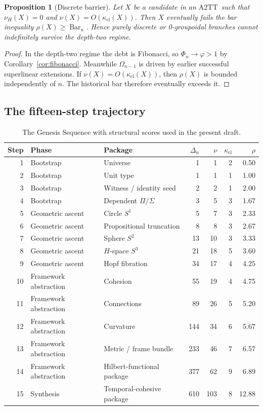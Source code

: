 \documentclass{lmcs}
\theoremstyle{plain}
\newtheorem{prop}[thm]{Proposition}
\theoremstyle{definition}
\theoremstyle{remark}
\newcommand{\ATwo}{\ensuremath{\mathrm{A2TT}}}
\newcommand{\SelBar}{\ensuremath{\operatorname{Bar}}}
\begin{document}
\begin{prop}[Discrete barrier]
\label{prop:discrete}
Let $X$ be a candidate in an \ATwo\ such that $\nu_H(X)=0$ and $\nu(X)=O(\kappa_{\mathrm{cl}}(X))$.
Then $X$ eventually fails the bar inequality $\rho(X)\ge \SelBar_n$.
Hence purely discrete or 0-groupoidal branches cannot indefinitely survive the depth-two regime.
\end{prop}

\begin{proof}
In the depth-two regime the debt is Fibonacci, so $\Phi_n\to \varphi>1$ by Corollary~\ref{cor:fibonacci}.
Meanwhile $\Omega_{n-1}$ is driven by earlier successful superlinear extensions.
If $\nu(X)=O(\kappa_{\mathrm{cl}}(X))$, then $\rho(X)$ is bounded independently of $n$.
The historical bar therefore eventually exceeds it.
\end{proof}

\subsection{The fifteen-step trajectory}

\begin{table}[tbp]
\centering
\caption{The Genesis Sequence with structural scores used in the present draft.}
\label{tab:genesis}
\small
\begin{tabular}{@{}rllrrrr@{}}
\toprule
Step & Phase & Package & $\Delta_n$ & $\nu$ & $\kappa_{\mathrm{cl}}$ & $\rho$ \\
\midrule
1  & Bootstrap & Universe & 1   & 1   & 2 & 0.50 \\
2  & Bootstrap & Unit type & 1   & 1   & 1 & 1.00 \\
3  & Bootstrap & Witness / identity seed & 2   & 2   & 1 & 2.00 \\
4  & Bootstrap & Dependent $\Pi/\Sigma$ & 3   & 5   & 3 & 1.67 \\
5  & Geometric ascent & Circle $S^1$ & 5   & 7   & 3 & 2.33 \\
6  & Geometric ascent & Propositional truncation & 8   & 8   & 3 & 2.67 \\
7  & Geometric ascent & Sphere $S^2$ & 13  & 10  & 3 & 3.33 \\
8  & Geometric ascent & $H$-space $S^3$ & 21  & 18  & 5 & 3.60 \\
9  & Geometric ascent & Hopf fibration & 34  & 17  & 4 & 4.25 \\
10 & Framework abstraction & Cohesion & 55  & 19  & 4 & 4.75 \\
11 & Framework abstraction & Connections & 89  & 26  & 5 & 5.20 \\
12 & Framework abstraction & Curvature & 144 & 34  & 6 & 5.67 \\
13 & Framework abstraction & Metric / frame bundle & 233 & 46  & 7 & 6.57 \\
14 & Framework abstraction & Hilbert-functional package & 377 & 62  & 9 & 6.89 \\
15 & Synthesis & Temporal-cohesive package & 610 & 103 & 8 & 12.88 \\
\bottomrule
\end{tabular}
\end{table}
\end{document}
